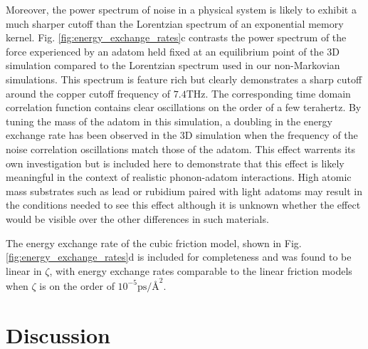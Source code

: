 \documentclass[7pt]{article}
\newcommand{\uzeta}{\si{\pico\second\per\angstrom\squared}}
\newcommand{\THz}{\si{\tera\hertz}}
\begin{document}
Moreover, the power spectrum of noise in a physical system is likely to exhibit a much sharper cutoff than the Lorentzian spectrum of an exponential memory kernel. Fig. \ref{fig:energy_exchange_rates}c contrasts the power spectrum of the force experienced by an adatom held fixed at an equilibrium point of the 3D simulation compared to the Lorentzian spectrum used in our non-Markovian simulations. This spectrum is feature rich but clearly demonstrates a sharp cutoff around the copper cutoff frequency of $7.4\THz$. The corresponding time domain correlation function contains clear oscillations on the order of a few terahertz. By tuning the mass of the adatom in this simulation, a doubling in the energy exchange rate has been observed in the 3D simulation when the frequency of the noise correlation oscillations match those of the adatom. This effect warrents its own investigation but is included here to demonstrate that this effect is likely meaningful in the context of realistic phonon-adatom interactions. High atomic mass substrates such as lead or rubidium paired with light adatoms may result in the conditions needed to see this effect although it is unknown whether the effect would be visible over the other differences in such materials.

The energy exchange rate of the cubic friction model, shown in Fig. \ref{fig:energy_exchange_rates}d is included for completeness and was found to be linear in $\zeta$, with energy exchange rates comparable to the linear friction models when $\zeta$ is on the order of $10^{-5}\uzeta$. 


\section*{Discussion}
\end{document}
